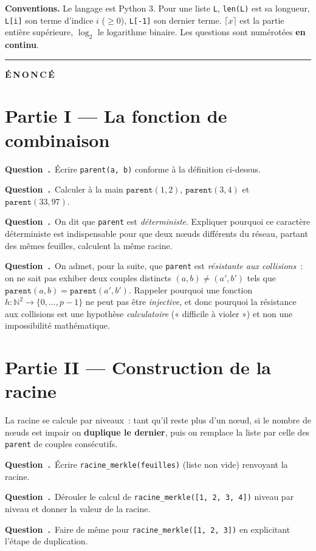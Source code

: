\documentclass[11pt,a4paper]{article}
\newcounter{qcnt}
\newcommand{\Q}{\medskip\par\stepcounter{qcnt}\noindent\textbf{Question~\theqcnt.}~}
\newcommand{\code}[1]{\lstinline!#1!}
\begin{document}
\noindent\textbf{Conventions.} Le langage est Python 3. Pour une liste \code{L}, \code{len(L)}
est sa longueur, \code{L[i]} son terme d'indice $i$ ($\ge 0$), \code{L[-1]} son dernier terme.
$\lceil x \rceil$ est la partie entière supérieure, $\log_2$ le logarithme binaire. Les questions
sont numérotées \textbf{en continu}.

\bigskip
\hrule
\bigskip
{\Large\bfseries É\,N\,O\,N\,C\,É}
\medskip

\section*{Partie I --- La fonction de combinaison}

\Q Écrire \code{parent(a, b)} conforme à la définition ci-dessus.

\Q Calculer à la main $\mathtt{parent}(1,2)$, $\mathtt{parent}(3,4)$ et
$\mathtt{parent}(33,97)$.

\Q On dit que \code{parent} est \emph{déterministe}. Expliquer pourquoi ce caractère déterministe
est indispensable pour que deux n\oe uds différents du réseau, partant des mêmes feuilles,
calculent la même racine.

\Q On admet, pour la suite, que \code{parent} est \emph{résistante aux collisions}~: on ne sait
pas exhiber deux couples distincts $(a,b)\neq(a',b')$ tels que $\mathtt{parent}(a,b)=
\mathtt{parent}(a',b')$. Rappeler pourquoi une fonction $h : \mathbb{N}^2 \to \{0,\dots,p-1\}$ ne
peut pas être \emph{injective}, et donc pourquoi la résistance aux collisions est une hypothèse
\emph{calculatoire} (« difficile à violer ») et non une impossibilité mathématique.

\section*{Partie II --- Construction de la racine}

La racine se calcule par niveaux~: tant qu'il reste plus d'un n\oe ud, si le nombre de n\oe uds
est impair on \textbf{duplique le dernier}, puis on remplace la liste par celle des
\code{parent} de couples consécutifs.

\Q Écrire \code{racine_merkle(feuilles)} (liste non vide) renvoyant la racine.

\Q Dérouler le calcul de \code{racine_merkle([1, 2, 3, 4])} niveau par niveau et donner la valeur
de la racine.

\Q Faire de même pour \code{racine_merkle([1, 2, 3])} en explicitant l'étape de duplication.
\end{document}
